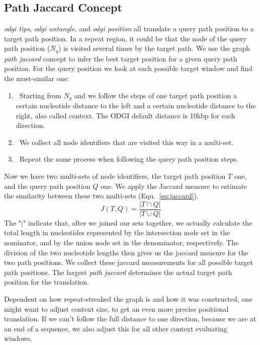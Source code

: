 \documentclass{bioinfo}
\begin{document}
\subsection{Path Jaccard Concept}
\textit{odgi tips}, \textit{odgi untangle}, and \textit{odgi position} all translate a query path position to a target path position. In a repeat region, it could be that the node of the query path position ($N_q$) is visited several times by the target path. We use the graph \textit{path jaccard} concept to infer the best target position for a given query path position. For the query position we look at each possible target window and find the most-similar one:
\begin{enumerate}
	\item~Starting from $N_q$ and we follow the steps of one target path position a certain nucleotide distance to the left and a certain nucleotide distance to the right, also called context. The ODGI default distance is 10kbp for each direction.
	\item~We collect all node identifiers that are visited this way in a multi-set.
	\item~Repeat the same process when following the query path position steps.
\end{enumerate}
Now we have two multi-sets of node identifiers, the target path position $T$ one, and the query path position $Q$ one. We apply the Jaccard measure to estimate the similarity between these two multi-sets (Equ.~\ref{eq:jaccard}).
\begin{equation}
	J(T,Q)=\frac{|T\cap Q|}{|T\cup Q|}
	\label{eq:jaccard}
\end{equation}
The "$|$" indicate that, after we joined our sets together, we actually calculate the total length in nucleotides represented by the intersection node set in the nominator, and by the union node set in the denominator, respectively. The division of the two nucleotide lengths then gives us the jaccard measure for the two path positions.
We collect these jaccard measurements for all possible target path positions. The largest \textit{path jaccard} determines the actual target path position for the translation.

Dependent on how repeat-streaked the graph is and how it was constructed, one might want to adjust context size, to get an even more precise positional translation. If we can't follow the full distance to one direction, because we are at an end of a sequence, we also adjust this for all other context evaluating windows.
\end{document}
